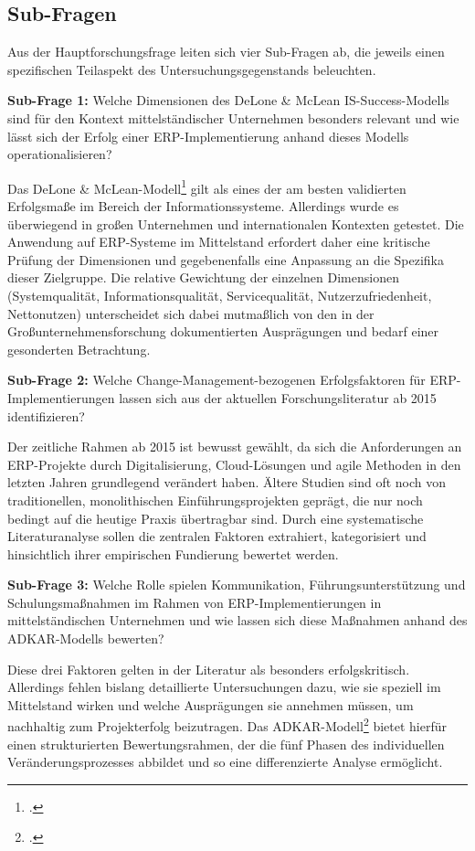 \subsection{Sub-Fragen}

Aus der Hauptforschungsfrage leiten sich vier Sub-Fragen ab, die jeweils einen spezifischen Teilaspekt des Untersuchungsgegenstands beleuchten.

\textbf{Sub-Frage 1:} Welche Dimensionen des DeLone \& McLean IS-Success-Modells sind für den Kontext mittelständischer Unternehmen besonders relevant und wie lässt sich der Erfolg einer ERP-Implementierung anhand dieses Modells operationalisieren?

Das DeLone \& McLean-Modell\footcite[Vgl.][S.~9--10]{delone2003} gilt als eines der am besten validierten Erfolgsma\ss{}e im Bereich der Informationssysteme. Allerdings wurde es überwiegend in gro\ss{}en Unternehmen und internationalen Kontexten getestet. Die Anwendung auf ERP-Systeme im Mittelstand erfordert daher eine kritische Prüfung der Dimensionen und gegebenenfalls eine Anpassung an die Spezifika dieser Zielgruppe. Die relative Gewichtung der einzelnen Dimensionen (Systemqualität, Informationsqualität, Servicequalität, Nutzerzufriedenheit, Nettonutzen) unterscheidet sich dabei mutma\ss{}lich von den in der Gro\ss{}unternehmensforschung dokumentierten Ausprägungen und bedarf einer gesonderten Betrachtung.

\textbf{Sub-Frage 2:} Welche Change-Management-bezogenen Erfolgsfaktoren für ERP-Implementierungen lassen sich aus der aktuellen Forschungsliteratur ab 2015 identifizieren?

Der zeitliche Rahmen ab 2015 ist bewusst gewählt, da sich die Anforderungen an ERP-Projekte durch Digitalisierung, Cloud-Lösungen und agile Methoden in den letzten Jahren grundlegend verändert haben. Ältere Studien sind oft noch von traditionellen, monolithischen Einführungsprojekten geprägt, die nur noch bedingt auf die heutige Praxis übertragbar sind. Durch eine systematische Literaturanalyse sollen die zentralen Faktoren extrahiert, kategorisiert und hinsichtlich ihrer empirischen Fundierung bewertet werden.

\textbf{Sub-Frage 3:} Welche Rolle spielen Kommunikation, Führungsunterstützung und Schulungsma\ss{}nahmen im Rahmen von ERP-Implementierungen in mittelständischen Unternehmen und wie lassen sich diese Ma\ss{}nahmen anhand des ADKAR-Modells bewerten?

Diese drei Faktoren gelten in der Literatur als besonders erfolgskritisch. Allerdings fehlen bislang detaillierte Untersuchungen dazu, wie sie speziell im Mittelstand wirken und welche Ausprägungen sie annehmen müssen, um nachhaltig zum Projekterfolg beizutragen. Das ADKAR-Modell\footcite[Vgl.][S.~126--127]{galli2018} bietet hierfür einen strukturierten Bewertungsrahmen, der die fünf Phasen des individuellen Veränderungsprozesses abbildet und so eine differenzierte Analyse ermöglicht.

